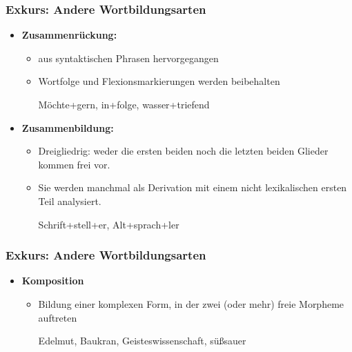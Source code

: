 \begin{frame}
\frametitle{Exkurs: Andere Wortbildungsarten}

\begin{itemize}
\item \textbf{Zusammenrückung:}

\begin{itemize}
\item aus syntaktischen Phrasen hervorgegangen
\item Wortfolge und Flexionsmarkierungen werden beibehalten

\ea Möchte+gern, in+folge, wasser+triefend
\z

\end{itemize}

\item \textbf{Zusammenbildung:}

\begin{itemize}
\item Dreigliedrig: weder die ersten beiden noch die letzten beiden Glieder kommen frei vor.
\item Sie werden manchmal als Derivation mit einem nicht lexikalischen ersten Teil analysiert.

\ea Schrift+stell+er, Alt+sprach+ler
\ex 
	\ea[?]{ {[}V schriftstell-{]} + {[}-er{]} }
	
	\vs 
	
	\ex[?]{ {[}N Schrift-{]} + {[}N -steller{]}}
	\z 
\z

\end{itemize}
\end{itemize}


\end{frame}


\begin{frame}
\frametitle{Exkurs: Andere Wortbildungsarten}

\begin{itemize}
\item \textbf{Komposition}

\begin{itemize}
\item Bildung einer komplexen Form, in der zwei (oder mehr) freie Morpheme auftreten

\ea Edelmut, Baukran, Geisteswissenschaft, süßsauer
\z

\end{itemize}

\end{itemize}

\end{frame}

